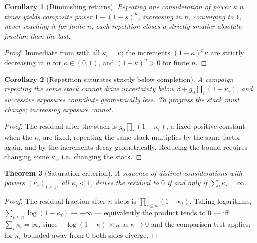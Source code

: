 \documentclass[11pt,a4paper]{article}
\theoremstyle{clstyle}
\newtheorem{theorem}{Theorem}[section]
\newtheorem{corollary}[theorem]{Corollary}
\theoremstyle{definition}
\theoremstyle{remark}
\newcommand{\flo}{\beta}
\begin{document}
\begin{corollary}[Diminishing returns]
\label{cor:diminishing}
Repeating one consideration of power $\kappa$ $n$ times yields composite
power $1-(1-\kappa)^n$, increasing in $n$, converging to $1$, never reaching
it for finite $n$; each repetition closes a strictly smaller absolute
fraction than the last.
\end{corollary}

\begin{proof}
Immediate from  with all $\kappa_i=\kappa$; the
increments $(1-\kappa)^{n}\kappa$ are strictly decreasing in $n$ for
$\kappa\in(0,1)$, and $(1-\kappa)^n>0$ for finite $n$.
\end{proof}

\begin{corollary}[Repetition saturates strictly below completion]
\label{cor:saturate}
A campaign repeating the same stack cannot drive uncertainty below
$\flo+g_0\prod_i(1-\kappa_i)$, and successive exposures contribute
geometrically less. To progress the stack must \emph{change}; increasing
exposure cannot.
\end{corollary}

\begin{proof}
The residual after the stack is $g_0\prod_i(1-\kappa_i)$, a fixed positive
constant when the $\kappa_i$ are fixed; repeating the same stack multiplies
by the same factor again, and by  the increments decay
geometrically. Reducing the bound requires changing some $\kappa_i$, i.e.\
changing the stack.
\end{proof}

\begin{theorem}[Saturation criterion]
\label{thm:saturation}
A sequence of \emph{distinct} considerations with powers $(\kappa_i)_{i\ge1}$,
all $\kappa_i<1$, drives the residual to $0$ if and only if
$\sum_i\kappa_i=\infty$.
\end{theorem}

\begin{proof}
The residual fraction after $n$ steps is $\prod_{i\le n}(1-\kappa_i)$. Taking
logarithms, $\sum_{i\le n}\log(1-\kappa_i)\to-\infty$ --- equivalently the
product tends to $0$ --- iff $\sum_i\kappa_i=\infty$, since
$-\log(1-\kappa)\asymp\kappa$ as $\kappa\to0$ and the comparison test
applies; for $\kappa_i$ bounded away from $0$ both sides diverge.
\end{proof}
\end{document}
